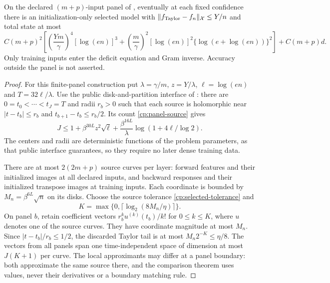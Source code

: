 \begin{proposition}
\label{cp:panel}
On the declared $(m+p)$-input panel of , eventually at each
fixed confidence there is an initialization-only selected model with
$\|f_{\rm Taylor}-f_n\|_{\mathcal X}\le Y/n$ and total state at most
\[
 C(m+p)^2\left[\left(\frac{Ym}\gamma\right)^4[\log(en)]^3+
       \left(\frac m\gamma\right)^2[\log(en)]^2
       \{\log(e+\log(en))\}^2\right]+C(m+p)d.
\]
Only training inputs enter the deficit equation and Gram inverse.
Accuracy outside the panel is not asserted.
\end{proposition}
\begin{proof}
For this finite-panel construction put $\lambda=\gamma/m$,
$z=Y/\lambda$, $\ell=\log(en)$ and $T=32\ell/\lambda$.
Use the public disk-and-partition interface of :
there are $0=t_0<\cdots<t_J=T$ and radii $r_b>0$ such that each
source is holomorphic near $|t-t_b|\le r_b$ and
$t_{b+1}-t_b\le r_b/2$. Its count \eqref{cp:panel-source} gives
\begin{equation}
 J\le1+\beta^{30L}z^2\sqrt\ell
             +\frac{\beta^{16L}}\lambda
                        \log(1+4\ell/\log2).
 \label{cp:panel-count}
\end{equation}
The centers and radii are deterministic functions of the problem
parameters, as that public interface guarantees, so they require
no later dense training data.

There are at most $2(2m+p)$ source curves per layer: forward features
and their initialized images at all declared inputs, and backward
responses and their initialized transpose images at training inputs.
Each coordinate is bounded by $M_n=\beta^{6L}\sqrt n$ on its disks.
Choose the source tolerance \eqref{cp:selected-tolerance} and
\[
 K=\max\{0,\lceil\log_2(8M_n/\eta)\rceil\}.
\]
On panel $b$, retain coefficient vectors
$r_b^ku^{(k)}(t_b)/k!$ for $0\le k\le K$, where $u$ denotes
one of the source curves.
They have coordinate magnitude at most $M_n$. Since
$|t-t_b|/r_b\le1/2$, the discarded Taylor tail is at
most $M_n2^{-K}\le\eta/8$. The vectors from all panels span one
time-independent space of dimension at most $J(K+1)$ per curve.
The local approximants may differ at a panel boundary: both
approximate the same source there, and the comparison theorem
uses values, never their derivatives or a boundary matching rule.


\end{proof}
